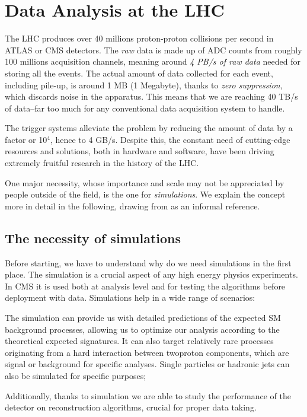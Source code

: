 \chapter{Data Analysis at the LHC}\label{ch:introduction}
The LHC produces over 40 millions proton-proton collisions per second in ATLAS or CMS detectors. The \emph{raw} data is made up of ADC counts from roughly 100 millions acquisition channels, meaning around \emph{4 PB/s of raw data} needed for storing all the events. The actual amount of data collected for each event, including pile-up, is around 1 MB (1 Megabyte), thanks to \emph{zero suppression}, which discards noise in the apparatus. This means that we are reaching 40 TB/s of data--far too much for any conventional data acquisition system to handle.

The trigger systems alleviate the problem by reducing the amount of data by a factor or 10$^{4}$, hence to 4 GB/s. Despite this, the constant need of cutting-edge resources and solutions, both in hardware and software, have been driving extremely fruitful research in the history of the LHC.

One major necessity, whose importance and scale may not be appreciated by people outside of the field, is the one for \emph{simulations}. We explain the concept more in detail in the following, drawing from \cite{sims} as an informal reference.

\section{The necessity of simulations}

Before starting, we have to understand why do we need simulations in the first place.
The simulation is a crucial aspect of any high energy physics experiments. In CMS it is used both
at analysis level and for testing the algorithms before deployment with data. 
Simulations help in a wide range of scenarios:

\begin{outline}
   \1  The simulation can provide us with detailed predictions of the expected SM background processes, allowing us to optimize our analysis according to the theoretical expected signatures. It can also target relatively rare processes originating from a hard interaction between twoproton components, which are signal or background for specific analyses. Single particles or hadronic jets can also be simulated for specific purposes;


\1 Additionally, thanks to simulation we are able to study the performance of the detector on reconstruction algorithms, crucial for proper data taking.
\end{outline}
